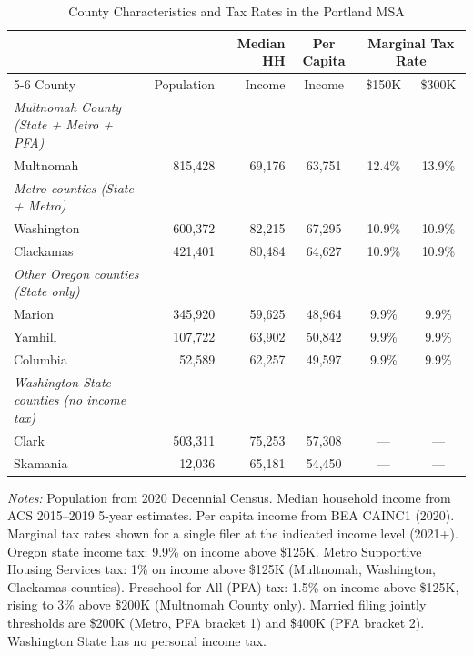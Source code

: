 \begin{table}[htbp]
\centering
\caption{County Characteristics and Tax Rates in the Portland MSA}
\label{tab:county_chars}
\begin{threeparttable}
{\footnotesize\setlength{\tabcolsep}{4pt}
\begin{tabular}{lrrccc}
\toprule
 & & Median HH & Per Capita & \multicolumn{2}{c}{Marginal Tax Rate} \\
\cmidrule(lr){5-6}
County & Population & Income & Income & \$150K & \$300K \\
\midrule
\textit{Multnomah County (State + Metro + PFA)} & & & & & \\
\quad Multnomah & 815,428 & 69,176 & 63,751 & 12.4\% & 13.9\% \\
\addlinespace
\textit{Metro counties (State + Metro)} & & & & & \\
\quad Washington & 600,372 & 82,215 & 67,295 & 10.9\% & 10.9\% \\
\quad Clackamas & 421,401 & 80,484 & 64,627 & 10.9\% & 10.9\% \\
\addlinespace
\textit{Other Oregon counties (State only)} & & & & & \\
\quad Marion & 345,920 & 59,625 & 48,964 & 9.9\% & 9.9\% \\
\quad Yamhill & 107,722 & 63,902 & 50,842 & 9.9\% & 9.9\% \\
\quad Columbia & 52,589 & 62,257 & 49,597 & 9.9\% & 9.9\% \\
\addlinespace
\textit{Washington State counties (no income tax)} & & & & & \\
\quad Clark & 503,311 & 75,253 & 57,308 & --- & --- \\
\quad Skamania & 12,036 & 65,181 & 54,450 & --- & --- \\
\bottomrule
\end{tabular}%
}
\begin{tablenotes}[flushleft]
\small
\item \textit{Notes:} Population from 2020 Decennial Census. Median household income from ACS 2015--2019 5-year estimates. Per capita income from BEA CAINC1 (2020). Marginal tax rates shown for a single filer at the indicated income level (2021+). Oregon state income tax: 9.9\% on income above \$125K. Metro Supportive Housing Services tax: 1\% on income above \$125K (Multnomah, Washington, Clackamas counties). Preschool for All (PFA) tax: 1.5\% on income above \$125K, rising to 3\% above \$200K (Multnomah County only). Married filing jointly thresholds are \$200K (Metro, PFA bracket 1) and \$400K (PFA bracket 2). Washington State has no personal income tax.
\end{tablenotes}
\end{threeparttable}
\end{table}
